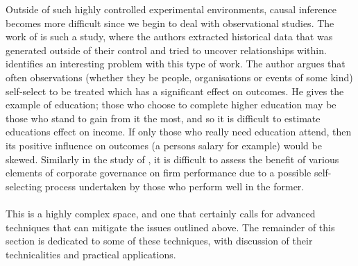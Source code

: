 {Outside of such highly controlled experimental environments, causal inference becomes more difficult since we begin to deal with observational studies. The work of \cite{moldovan2015learning} is such a study, where the authors extracted historical data that was generated outside of their control and tried to uncover relationships within. \cite{esarey2015causal} identifies an interesting problem with this type of work. The author argues that often observations (whether they be people, organisations or events of some kind) self-select to be treated which has a significant effect on outcomes. He gives the example of education; those who choose to complete higher education may be those who stand to gain from it the most, and so it is difficult to estimate educations effect on income. If only those who really need education attend, then its positive influence on outcomes (a persons salary for example) would be skewed. Similarly in the study of \cite{moldovan2015learning}, it is difficult to assess the benefit of various elements of corporate governance on firm performance due to a possible self-selecting process undertaken by those who perform well in the former. \\\\
This is a highly complex space, and one that certainly calls for advanced techniques that can mitigate the issues outlined above. The remainder of this section is dedicated to some of these techniques, with discussion of their technicalities and practical applications.  }
